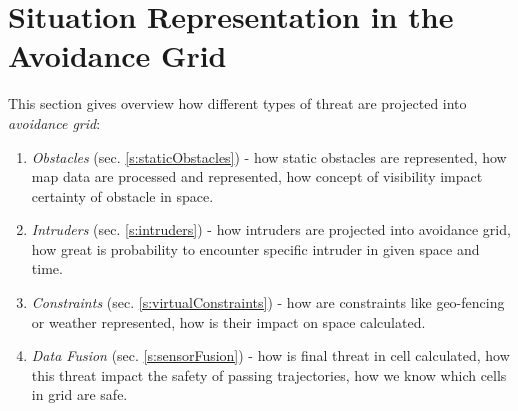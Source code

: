 \section{Situation Representation in the Avoidance Grid}\label{sec:situationAssessment}
This section gives overview how different types of threat are projected into \emph{avoidance grid}:
\begin{enumerate}
	\item\emph{Obstacles} (sec. \ref{s:staticObstacles}) - how static obstacles are represented, how map data are processed and represented, how concept of visibility impact certainty of obstacle in space.
	
	\item\emph{Intruders} (sec. \ref{s:intruders}) - how intruders are projected into avoidance grid, how great is probability to encounter specific intruder in given space and time.
	
	\item\emph{Constraints} (sec. \ref{s:virtualConstraints}) - how are constraints like geo-fencing or weather represented, how is their impact on space calculated.
	
	\item\emph{Data Fusion} (sec. \ref{s:sensorFusion}) - how is final threat in cell calculated, how this threat impact the safety of passing trajectories, how we know which cells in grid are safe.
\end{enumerate}